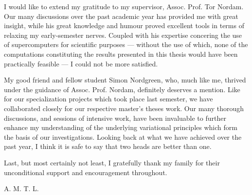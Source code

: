 I would like to extend my gratitude to my supervisor, Assoc. Prof. Tor Nordam.
Our many discussions over the past academic year has provided me with great
insight, while his great knowledge and humour proved excellent tools in terms
of relaxing my early-semester nerves. Coupled with his expertise concering the
use of supercomputers for scientific purposes --- without the use of which,
none of the computations constituting the results presented in this thesis
would have been practically feasible --- I could not be more satisfied.

My good friend and fellow student Simon Nordgreen, who, much like me, thrived
under the guidance of Assoc. Prof. Nordam, definitely deserves a mention. Like
for our specialization projects which took place last semester, we have
collaborated closely for our respective master's theses work. Our many thorough
discussions, and sessions of intensive work, have been invaluable to further
enhance my understanding of the underlying variational principles which form
the basis of our investigations. Looking back at what we have achieved over the
past year, I think it is safe to say that two heads are better than one.


Last, but most certainly not least, I gratefully thank my family for their
unconditional support and encouragement throughout.

\begin{minipage}[t]{\textwidth}
\begin{flushright}
A. M. T. L.
\end{flushright}
\end{minipage}
